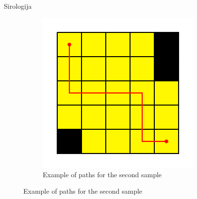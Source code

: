 \begin{statement}[
  problempoints=100,
  timelimit=1 second,
  memorylimit=1024 MiB,
]{Sirologija}
\begin{figure}[!h]
\begin{subfigure}{0.40\linewidth}
    \end{subfigure}
    \begin{subfigure}{0.40\linewidth}
      \centering
      \includegraphics[width=\linewidth]{pic/sir2.png}
      \caption{Example of paths for the second sample}

    \end{subfigure}

  \end{figure}
  
\end{statement}

